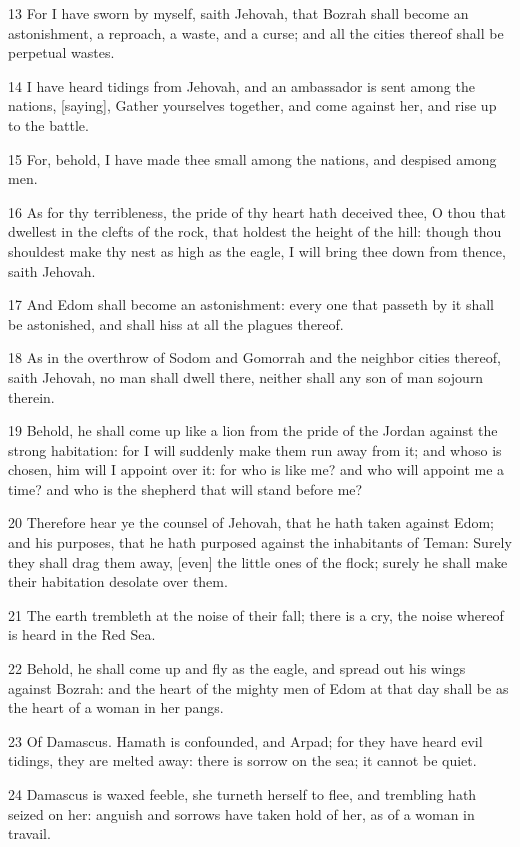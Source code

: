 \par 13 For I have sworn by myself, saith Jehovah, that Bozrah shall become an astonishment, a reproach, a waste, and a curse; and all the cities thereof shall be perpetual wastes.
\par 14 I have heard tidings from Jehovah, and an ambassador is sent among the nations, [saying], Gather yourselves together, and come against her, and rise up to the battle.
\par 15 For, behold, I have made thee small among the nations, and despised among men.
\par 16 As for thy terribleness, the pride of thy heart hath deceived thee, O thou that dwellest in the clefts of the rock, that holdest the height of the hill: though thou shouldest make thy nest as high as the eagle, I will bring thee down from thence, saith Jehovah.
\par 17 And Edom shall become an astonishment: every one that passeth by it shall be astonished, and shall hiss at all the plagues thereof.
\par 18 As in the overthrow of Sodom and Gomorrah and the neighbor cities thereof, saith Jehovah, no man shall dwell there, neither shall any son of man sojourn therein.
\par 19 Behold, he shall come up like a lion from the pride of the Jordan against the strong habitation: for I will suddenly make them run away from it; and whoso is chosen, him will I appoint over it: for who is like me? and who will appoint me a time? and who is the shepherd that will stand before me?
\par 20 Therefore hear ye the counsel of Jehovah, that he hath taken against Edom; and his purposes, that he hath purposed against the inhabitants of Teman: Surely they shall drag them away, [even] the little ones of the flock; surely he shall make their habitation desolate over them.
\par 21 The earth trembleth at the noise of their fall; there is a cry, the noise whereof is heard in the Red Sea.
\par 22 Behold, he shall come up and fly as the eagle, and spread out his wings against Bozrah: and the heart of the mighty men of Edom at that day shall be as the heart of a woman in her pangs.
\par 23 Of Damascus. Hamath is confounded, and Arpad; for they have heard evil tidings, they are melted away: there is sorrow on the sea; it cannot be quiet.
\par 24 Damascus is waxed feeble, she turneth herself to flee, and trembling hath seized on her: anguish and sorrows have taken hold of her, as of a woman in travail.
